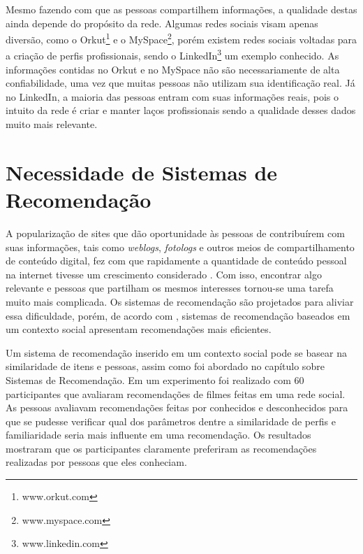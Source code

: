 Mesmo fazendo com que as pessoas compartilhem informações, a qualidade destas ainda depende do propósito da rede. Algumas redes sociais visam apenas diversão, como o Orkut\footnote{www.orkut.com} e o MySpace\footnote{www.myspace.com}, porém existem redes sociais voltadas para a criação de perfis profissionais, sendo o LinkedIn\footnote{www.linkedin.com} um exemplo conhecido. As informações contidas no Orkut e no MySpace não são necessariamente de alta confiabilidade, uma vez que muitas pessoas não utilizam sua identificação real. Já no LinkedIn, a maioria das pessoas entram com suas informações reais, pois o intuito da rede é criar e manter laços profissionais sendo a qualidade desses dados muito mais relevante.

\section{Necessidade de Sistemas de Recomendação}

A popularização de sites que dão oportunidade às pessoas de contribuírem com suas informações, tais como \textit{weblogs}, \textit{fotologs} e outros meios de compartilhamento de conteúdo digital, fez com que rapidamente a quantidade de conteúdo pessoal na internet tivesse um crescimento considerado \cite{bonhard2007devil}. Com isso, encontrar algo relevante e pessoas que partilham os mesmos interesses tornou-se uma tarefa muito mais complicada. Os sistemas de recomendação são projetados para aliviar essa dificuldade, porém, de acordo com \cite{bonhard2007devil}, sistemas de recomendação baseados em um contexto social apresentam recomendações mais eficientes.

Um sistema de recomendação inserido em um contexto social pode se basear na similaridade de itens e pessoas, assim como foi abordado no capítulo sobre Sistemas de Recomendação. Em \cite{bonhard2007devil} um experimento foi realizado com 60 participantes que avaliaram recomendações de filmes feitas em uma rede social. As pessoas avaliavam recomendações feitas por conhecidos e desconhecidos para que se pudesse verificar qual dos parâmetros dentre a similaridade de perfis e familiaridade seria mais influente em uma recomendação. Os resultados mostraram que os participantes claramente preferiram as recomendações realizadas por pessoas que eles conheciam.


